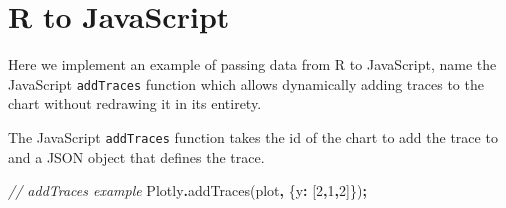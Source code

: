\documentclass[
]{krantz}
\makeatletter
\newenvironment{Shaded}{\begin{snugshade}}{\end{snugshade}}
\newcommand{\CommentTok}[1]{\textcolor[rgb]{0.37,0.37,0.37}{\textit{#1}}}
\newcommand{\ControlFlowTok}[1]{\textcolor[rgb]{0.27,0.27,0.27}{\textbf{#1}}}
\newcommand{\DataTypeTok}[1]{\textcolor[rgb]{0.27,0.27,0.27}{#1}}
\newcommand{\DecValTok}[1]{\textcolor[rgb]{0.06,0.06,0.06}{#1}}
\newcommand{\FunctionTok}[1]{\textcolor[rgb]{0,0,0}{#1}}
\newcommand{\KeywordTok}[1]{\textcolor[rgb]{0.27,0.27,0.27}{\textbf{#1}}}
\newcommand{\NormalTok}[1]{#1}
\newcommand{\OperatorTok}[1]{\textcolor[rgb]{0.43,0.43,0.43}{\textbf{#1}}}
\newcommand{\StringTok}[1]{\textcolor[rgb]{0.5,0.5,0.5}{#1}}
\newenvironment{kframe}{%
\medskip{}
\setlength{\fboxsep}{.8em}
 \def\at@end@of@kframe{}%
 \ifinner\ifhmode%
  \def\at@end@of@kframe{\end{minipage}}%
  \begin{minipage}{\columnwidth}%
 \fi\fi%
 \def\FrameCommand##1{\hskip\@totalleftmargin \hskip-\fboxsep
 \colorbox{shadecolor}{##1}\hskip-\fboxsep
     \hskip-\linewidth \hskip-\@totalleftmargin \hskip\columnwidth}%
 \MakeFramed {\advance\hsize-\width
   \@totalleftmargin\z@ \linewidth\hsize
   \@setminipage}}%
 {\par\unskip\endMakeFramed%
 \at@end@of@kframe}
\renewenvironment{Shaded}{\begin{kframe}}{\end{kframe}}
\makeatother
\begin{document}
\begin{Shaded}
\end{Shaded}

\hypertarget{r-to-javascript-1}{%
\section*{R to JavaScript}\label{r-to-javascript-1}}


Here we implement an example of passing data from R to JavaScript, name the JavaScript \texttt{addTraces} function which allows dynamically adding traces to the chart without redrawing it in its entirety.

The JavaScript \texttt{addTraces} function takes the id of the chart to add the trace to and a JSON object that defines the trace.

\begin{Shaded}
\begin{Highlighting}[]
\CommentTok{// addTraces example}
\NormalTok{Plotly}\OperatorTok{.}\FunctionTok{addTraces}\NormalTok{(}\StringTok{\textquotesingle{}plot\textquotesingle{}}\OperatorTok{,}\NormalTok{ \{}\DataTypeTok{y}\OperatorTok{:}\NormalTok{ [}\DecValTok{2}\OperatorTok{,}\DecValTok{1}\OperatorTok{,}\DecValTok{2}\NormalTok{]\})}\OperatorTok{;}
\end{Highlighting}
\end{Shaded}
\end{document}
